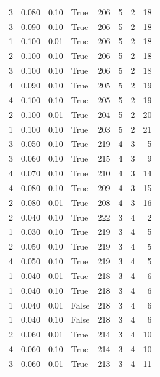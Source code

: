 \documentclass[a4paper,twoside,12pt]{book}
\begin{document}
\begin{table}
\begin{tabular}{rrrlrrrr}
				3 &  0.080 &     0.10 &     True &  206 &  5 &   2 &  18 \\
				3 &  0.090 &     0.10 &     True &  206 &  5 &   2 &  18 \\
				1 &  0.100 &     0.01 &     True &  206 &  5 &   2 &  18 \\
				2 &  0.100 &     0.10 &     True &  206 &  5 &   2 &  18 \\
				3 &  0.100 &     0.10 &     True &  206 &  5 &   2 &  18 \\
				4 &  0.090 &     0.10 &     True &  205 &  5 &   2 &  19 \\
				4 &  0.100 &     0.10 &     True &  205 &  5 &   2 &  19 \\
				2 &  0.100 &     0.01 &     True &  204 &  5 &   2 &  20 \\
				1 &  0.100 &     0.10 &     True &  203 &  5 &   2 &  21 \\
				3 &  0.050 &     0.10 &     True &  219 &  4 &   3 &   5 \\
				3 &  0.060 &     0.10 &     True &  215 &  4 &   3 &   9 \\
				4 &  0.070 &     0.10 &     True &  210 &  4 &   3 &  14 \\
				4 &  0.080 &     0.10 &     True &  209 &  4 &   3 &  15 \\
				2 &  0.080 &     0.01 &     True &  208 &  4 &   3 &  16 \\
				2 &  0.040 &     0.10 &     True &  222 &  3 &   4 &   2 \\
				1 &  0.030 &     0.10 &     True &  219 &  3 &   4 &   5 \\
				2 &  0.050 &     0.10 &     True &  219 &  3 &   4 &   5 \\
				4 &  0.050 &     0.10 &     True &  219 &  3 &   4 &   5 \\
				1 &  0.040 &     0.01 &     True &  218 &  3 &   4 &   6 \\
				1 &  0.040 &     0.10 &     True &  218 &  3 &   4 &   6 \\
				1 &  0.040 &     0.01 &    False &  218 &  3 &   4 &   6 \\
				1 &  0.040 &     0.10 &    False &  218 &  3 &   4 &   6 \\
				2 &  0.060 &     0.01 &     True &  214 &  3 &   4 &  10 \\
				4 &  0.060 &     0.10 &     True &  214 &  3 &   4 &  10 \\
				3 &  0.060 &     0.01 &     True &  213 &  3 &   4 &  11 \\

\end{tabular}
\end{table}
\end{document}
